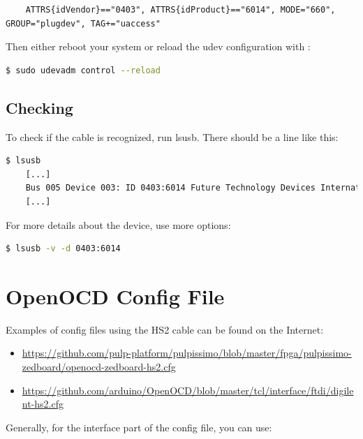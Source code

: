 \documentclass{article}
\begin{document}
    \begin{lstlisting}
    ATTRS{idVendor}=="0403", ATTRS{idProduct}=="6014", MODE="660", GROUP="plugdev", TAG+="uaccess"
    \end{lstlisting}
    
    Then either reboot your system or reload the udev configuration with :
    
    \begin{lstlisting}[language=bash]
    $ sudo udevadm control --reload
    \end{lstlisting}
    
    \subsection{Checking}
    
    To check if the cable is recognized, run lsusb. There should be a line like this:
    
    \begin{lstlisting}[language=bash]
    $ lsusb
    [...]
    Bus 005 Device 003: ID 0403:6014 Future Technology Devices International, Ltd FT232H Single HS USB-UART/FIFO IC
    [...]
    \end{lstlisting}
    
    For more details about the device, use more options:
    
    \begin{lstlisting}[language=bash]
    $ lsusb -v -d 0403:6014
    \end{lstlisting}
    
    \newpage
    \section{OpenOCD Config File}
    
    Examples of config files using the HS2 cable can be found on the Internet:
    
    \vspace{-\topsep}
	\begin{itemize}
	\item \url{https://github.com/pulp-platform/pulpissimo/blob/master/fpga/pulpissimo-zedboard/openocd-zedboard-hs2.cfg}
	\item \url{https://github.com/arduino/OpenOCD/blob/master/tcl/interface/ftdi/digilent-hs2.cfg}
	\end{itemize}
	
	Generally, for the interface part of the config file, you can use:
	
\end{document}
